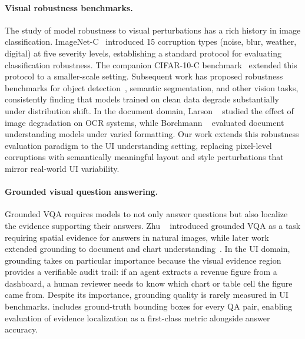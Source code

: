 \paragraph{Visual robustness benchmarks.}
The study of model robustness to visual perturbations has a rich history in image classification. ImageNet-C~\cite{hendrycks2019imagenetc} introduced 15 corruption types (noise, blur, weather, digital) at five severity levels, establishing a standard protocol for evaluating classification robustness. The companion CIFAR-10-C benchmark~\cite{hendrycks2019cifarc} extended this protocol to a smaller-scale setting. Subsequent work has proposed robustness benchmarks for object detection~\cite{michaelis2019objectdetection}, semantic segmentation, and other vision tasks, consistently finding that models trained on clean data degrade substantially under distribution shift. In the document domain, Larson \etal~\cite{larson2022docrobust} studied the effect of image degradation on OCR systems, while Borchmann \etal~\cite{borchmann2021due} evaluated document understanding models under varied formatting. Our work extends this robustness evaluation paradigm to the UI understanding setting, replacing pixel-level corruptions with semantically meaningful layout and style perturbations that mirror real-world UI variability.

\paragraph{Grounded visual question answering.}
Grounded VQA requires models to not only answer questions but also localize the evidence supporting their answers. Zhu \etal~\cite{zhu2016cvpr} introduced grounded VQA as a task requiring spatial evidence for answers in natural images, while later work extended grounding to document and chart understanding~\cite{masry2022chartqa,chen2023palix}. In the UI domain, grounding takes on particular importance because the visual evidence region provides a verifiable audit trail: if an agent extracts a revenue figure from a dashboard, a human reviewer needs to know which chart or table cell the figure came from. Despite its importance, grounding quality is rarely measured in UI benchmarks. \bench{} includes ground-truth bounding boxes for every QA pair, enabling evaluation of evidence localization as a first-class metric alongside answer accuracy.

